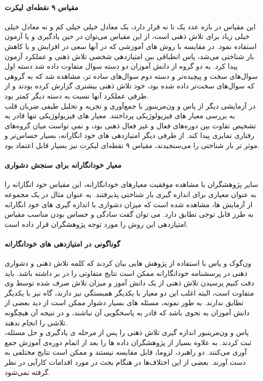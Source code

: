 \paragraph{مقیاس ۹ نقطه‌ای لیکرت}
این مقیاس در بازه عدد یک تا نه قرار دارد، یک معادل خیلی خیلی کم و نه معادل خیلی خیلی زیاد برای تلاش ذهنی است، از این مقیاس می‌توان در حین یادگیری و یا آزمون استفاده نمود. در مقایسه با روش های آموزشی که در آنها سعی در افزایش و یا کاهش بار شناختی می‌شد، پاس انطباقی بین امتیازدهی شخصی تلاش ذهنی و عملکرد آزمون پیدا کرد. به دو گروه از دانش آموزان دو دسته سوال متفاوت داده شد دسته اول سوال‌های سخت و پیچیده‌تر و دسته دوم سوال‌های ساده تر، مشاهده شد که به گروهی که سوال‌های سخت‌تر داده شده بود، خود تلاش ذهنی بیشتری گزارش کرده بودند و از طرفی عملکرد آنها نسبت به دسته دیگر کمتر بود.
\cite{paas1992training}
\\
در آزمایشی دیگر از پاس و ون‌مرینبور با جمع‌آوری و تجزیه و تحلیل طیفی ضربان قلب به بررسی معیار های فیزیولوژیکی پرداختند. معیار های فیزیولوژیکی تنها قادر به تشخیص تفاوت بین دوره‌های فعال و غیر فعال ذهنی بود، و نمی تواست میان گروه‌های رفتاری تمایزی پیدا کند. از طرفی دیگر امتیازدهی های خود انگارانه، بسیار حساس‌تر و موثر تر بار شناختی را می‌سنجیدند، مقیاس ۹ نقطه‌ای لیکرت نیز بسیار قابل اعتماد بود.
\paragraph{معیار خودانگارانه برای سنجش دشواری}
سایر پژوهشگران با مشاهده موفقیت معیار‌های خودانگارانه، این مقیاس خود انگارانه را به عنوان معیاری برای اندازه گیری بار شناختی پذیرفتند. به عنوان مثال در یک مجموعه از آزمایش ها، مشاهده شده است که میزان دشواری با اندازه گیری های خود انگارانه به طرز قابل توجی تطابق دارد.
\cite{marcus1996understanding}
می توان گفت سادگی و حساس بودن مناسب مقیاس امتیازدهی این روش را مورد توجه پژوهشگران قرار داده است.
\paragraph{گوناگونی در امتیازدهی های خودانگارانه}
ون‌گوک و پاس با استفاده از پژوهش هایی بیان کردند که کلمه تلاش ذهنی و دشواری ذهنی در پرسشنامه خودانگارانه ممکن است نتایج متفاوتی را در بر داشته باشد.
باید دقت کنیم پرسیدن تلاش ذهنی از یک دانش آموز و میزان تلاش صرف شده توسط وی متفاوت است، البته اغلب این دو معیار با یکدیگر همبستگی نیز دارند، گاه نیز با یکدیگر تطابق ندارند. به طور نمونه، مسئله های بسیار دشوار ممکن است از دید بعضی از دانش آموزان به نحوی باشد که قادر به پاسخگویی آن نباشند، و در نتیجه آن هیچگونه تلاشی را انجام ندهند.
\cite{van2008instructional}
\\
پاس و ون‌مرینبور اندازه گیری تلاش ذهنی را پس از مرحله ی یادگیری و حل مسئله، ثبت کردند. به علاوه بسیار از پژوهشگران داده ها را بعد از اتمام دوره‌ی آموزش جمع آوری می‌کنند. دو راهبرد، لزوما، قابل مقایسه نیستند و ممکن است نتایج مختلفی به دست آورند. بعضی از این اختلاف‌ها در هنگام بحث در مورد اقدامات کارآیی در نظر گرفته نمی‌شود.
\cite{paas1994measurement}
